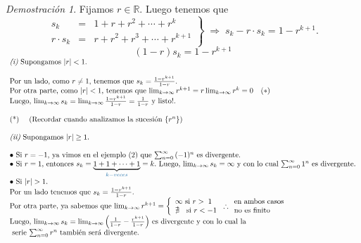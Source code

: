 \documentclass{article}
\theoremstyle{definition}
\theoremstyle{definition}
\theoremstyle{remark}
\newtheorem*{demo}{Demostración}
\begin{document}
\begin{demo}
  Fijamos $r \in \mathbb{R} $. Luego tenemos que \[  
  \left. \begin{array}{rcl}
      s_k  & = & 1+r+r^2+ \cdots + r^k \\
      r \cdot s_k & = & r+r^2+r^3+\cdots + r^{k+1}
  \end{array} \right\} \; \Rightarrow \; s_k-r\cdot s_k=1-r^{k+1}. \]
 $$(1-r)s_k=1-r^{k+1}$$
$\begin{array}{l}
  \emph{(i)} \text{ Supongamos } |r|<1. \\\\ 
  \text{Por un lado, como $r \neq 1$, tenemos que $s_k=\frac{1-r^{k+1}}{1-r}.$} \\
\text{Por otra parte, como $|r|<1$, tenemos que $\lim_{k \to \infty}{r^{k+1}=r\lim_{k\to\infty}{r^k}=0}$} \quad (*) \\
\text{Luego, $\lim_{k \to \infty}{s_k}=\lim_{k \to \infty}{\frac{1-r^{k+1}}{1-r}}=\frac{1}{1-r}$ y listo!.} \\ \\

\text{(*) \quad (Recordar cuando analizamos la sucesión $\{r^n\}$)} \\\\ 
\emph{(ii)} \text{ Supongamos $|r| \geq 1$}. \\\\
\bullet \text{ Si $r=-1$, ya vimos en el ejemplo (2) que $\sum_{n=0}^{\infty}{(-1)^n} $ es divergente.} \\
\bullet \text{ Si $r=1$, entonces $s_k=\underbrace{1+1+\dots+1}_{\textcolor{azulp2}{k-veces}}=k.$ Luego, $\lim_{k\to\infty}{s_k=\infty}$ y con lo cual $\sum_{n=0}^{\infty}{1^n}$ es divergente.} \\
\bullet \text{ Si $|r|>1$.} \\ 
\text{Por un lado tenemos que $s_k=\frac{1-r^{k+1}}{1-r}$.} \\ 
\text{Por otra parte, ya sabemos que $\lim_{k\to\infty}{r^{k+1}}=\left\{ \begin{array}{l}
\infty \text{ si $r>\phantom{.}1$}\\
\nexists  \text{ \; si $r<-1$}
\end{array}\right. \therefore \begin{array}l 
\text{en ambos casos} \\ 
\text{no es finito}
\end{array}$}
\\
\text{Luego, $\lim_{k\to\infty}{s_k}=\lim_{k\to\infty}{\left(\frac{1}{1-r}-\frac{r^{k+1}}{1-r}\right)}$ es divergente y con lo cual la} \\ \text{ serie $\sum_{n=0}^{\infty}{r^n}$ también será divergente.}
\end{array}$\\\\
\end{demo}
\end{document}
